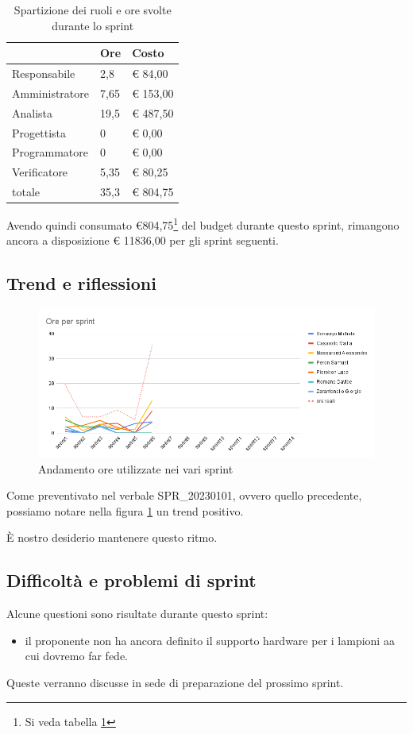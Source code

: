 \begin{table}[ht]
    \begin{tabularx}{\linewidth}{X|l|l}
    \rowcolor{gray!30}& Ore & Costo \\
    \hline
    
    Responsabile & 2,8 & € 84,00 \\
    \rowcolor{gray!10}Amministratore & 7,65 & € 153,00 \\
    Analista & 19,5 & € 487,50 \\
    \rowcolor{gray!10}Progettista & 0 & € 0,00 \\
    Programmatore & 0 & € 0,00 \\
    \rowcolor{gray!10}Verificatore & 5,35 &€ 80,25 \\
    totale & 35,3 & € 804,75 \\
    \end{tabularx}
    \caption{\label{costi-ruolo}Spartizione dei ruoli e ore svolte durante lo sprint}
\end{table}


Avendo quindi consumato €804,75\footnote{Si veda tabella \ref{costi-ruolo}} del budget durante questo sprint, rimangono ancora a disposizione € 11836,00 per gli sprint seguenti.

\subsection{Trend e riflessioni}

\begin{figure}[ht]
    \includegraphics[width=\linewidth]{img/andamento.png}
    \caption{Andamento ore utilizzate nei vari sprint}\label{img:andamento}
\end{figure}

Come preventivato nel verbale SPR\_20230101, ovvero quello precedente, possiamo notare nella figura \ref{img:andamento} un trend positivo.

È nostro desiderio mantenere questo ritmo.

\subsection{Difficoltà e problemi di sprint}

Alcune questioni sono risultate durante questo sprint:

\begin{itemize}
    \item il proponente non ha ancora definito il supporto hardware per i lampioni aa cui dovremo far fede.
\end{itemize}

Queste verranno discusse in sede di preparazione del prossimo sprint.
